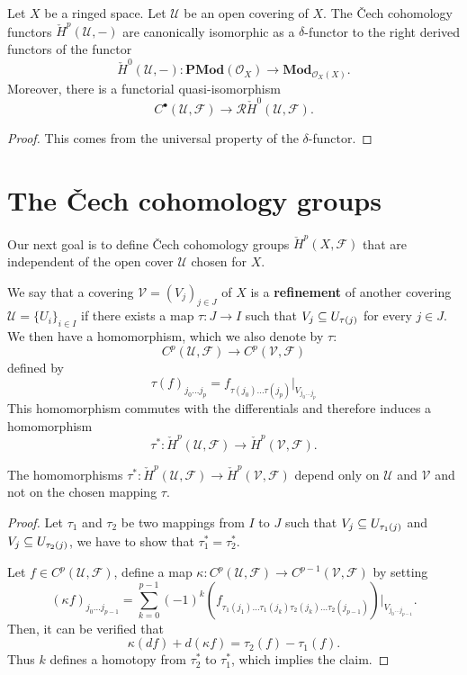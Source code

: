 \begin{proposition}
Let $X$ be a ringed space. Let $\mathcal{U}$ be an open covering of $X$. The \v{C}ech cohomology functors $\check{H}^p(\mathcal{U},-)$ are canonically isomorphic as a $\delta$-functor to the right derived functors of the functor 
\[\check{H}^0(\mathcal{U},-):\mathbf{PMod}(\mathscr{O}_X)\to\mathbf{Mod}_{\mathscr{O}_X(X)}.\]
Moreover, there is a functorial quasi-isomorphism
\[C^\bullet(\mathcal{U},\mathscr{F})\to\mathcal{R}\check{H}^0(\mathcal{U},\mathscr{F}).\]
\end{proposition}
\begin{proof}
This comes from the universal property of the $\delta$-functor.
\end{proof}
\section{The \v{C}ech cohomology groups}
Our next goal is to define \v{C}ech cohomology groups $\check{H}^p(X,\mathscr{F})$ that are independent of the open cover $\mathcal{U}$ chosen for $X$.\par
We say that a covering $\mathcal{V}=(V_j)_{j\in J}$ of $X$ is a \textbf{refinement} of another covering $\mathcal{U}=\{U_i\}_{i\in I}$ if there exists a map $\tau:J\to I$ such that $V_j\subseteq U_{\tau(j)}$ for every $j\in J$. We then have a homomorphism, which we also denote by $\tau$:
\[C^p(\mathcal{U},\mathscr{F})\to C^p(\mathcal{V},\mathscr{F})\]
defined by
\[\tau(f)_{j_0\dots j_p}=f_{\tau(j_0)\dots\tau(j_p)}|_{V_{j_0\dots j_p}}\]
This homomorphism commutes with the differentials and therefore induces a
homomorphism
\[\tau^*:\check{H}^p(\mathcal{U},\mathscr{F})\to\check{H}^p(\mathcal{V},\mathscr{F}).\]
\begin{proposition}\label{Cech refinement map}
The homomorphisms $\tau^*:\check{H}^p(\mathcal{U},\mathscr{F})\to\check{H}^p(\mathcal{V},\mathscr{F})$ depend only on $\mathcal{U}$ and $\mathcal{V}$ and not on the chosen mapping $\tau$.
\end{proposition}
\begin{proof}
Let $\tau_1$ and $\tau_2$ be two mappings from $I$ to $J$ such that $V_j\subseteq U_{\tau_1(j)}$ and $V_j\subseteq U_{\tau_2(j)}$, we have to show that $\tau_1^*=\tau_2^*$.\par
Let $f\in C^p(\mathcal{U},\mathscr{F})$, define a map $\kappa:C^p(\mathcal{U},\mathscr{F})\to C^{p-1}(\mathcal{V},\mathscr{F})$ by setting
\[(\kappa f)_{j_0\dots j_{p-1}}=\sum_{k=0}^{p-1}(-1)^k(f_{\tau_1(j_1)\dots\tau_1(j_k)\tau_2(j_k)\dots\tau_2(j_{p-1})})|_{V_{j_0\dots j_{p-1}}}.\]
Then, it can be verified that
\[\kappa(df)+d(\kappa f)=\tau_2(f)-\tau_1(f).\]
Thus $k$ defines a homotopy from $\tau_2^*$ to $\tau_1^*$, which implies the claim.
\end{proof}
